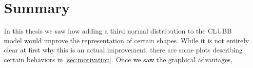 \chapter{Summary}\label{ch:summary}

In this thesis we saw how adding a third normal distribution to the \gls{CLUBB} model
would improve the representation of certain shapes.
While it is not entirely clear at first why this is an actual improvement,
there are some plots describing certain behaviors in \cref{sec:motivation}.
Once we saw the graphical advantages,
